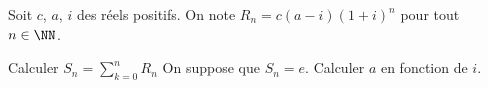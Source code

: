 %
%
Soit $c$, $a$, $i$ des réels positifs. On note $R_n = c(a-i)(1+i)^n$ pour tout $n\in \NN$.
	\begin{tasks}
		\task Calculer $S_n = \sum\limits_{k=0}^n R_n$
		\task On suppose que $S_n = e$. Calculer $a$ en fonction de $i$.
	\end{tasks}
